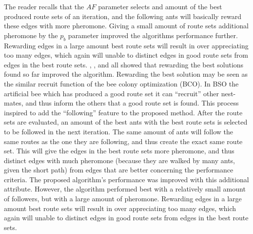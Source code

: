 The reader recalls that the $AF$ parameter selects and amount of the best produced route sets of an iteration, and the following ants will basically reward these edges with more pheromone. Giving a small amount of route sets additional pheromone by the $p_b$ parameter improved the algorithms performance further. Rewarding edges in a large amount best route sets will result in over appreciating too many edges, which again will unable to distinct edges in good route sets from edges in the best route sets. \citet{salehi-nezhad07}, \citet{tripathi09}, and \citet{sedighpour14} all showed that rewarding the best solutions found so far improved the algorithm. Rewarding the best solution may be seen as the similar recruit function of the bee colony optimization (BCO). In BSO the artificial bee which has produced a good route set it can ``recruit'' other nest-mates, and thus inform the others that a good route set is found. This process inspired to add the ``following'' feature to the proposed method. After the route sets are evaluated, an amount of the best ants with the best route sets is selected to be followed in the next iteration. The same amount of ants will follow the same routes as the one they are following, and thus create the exact same route set. This will give the edges in the best route sets more pheromone, and thus distinct edges with much pheromone (because they are walked by many ants, given the short path) from edges that are better concerning the performance criteria. The proposed algorithm's performance was improved with this additional attribute. However, the algorithm performed best with a relatively small amount of followers, but with a large amount of pheromone.  Rewarding edges in a large amount best route sets will result in over appreciating too many edges, which again will unable to distinct edges in good route sets from edges in the best route sets.  %

